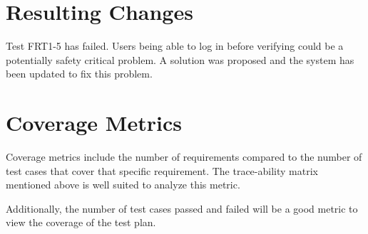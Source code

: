 \documentclass[12pt,fleqn]{article}
\begin{document}
\section{Resulting Changes}
Test FRT1-5 has failed. Users being able to log in before verifying could be a potentially safety critical problem. A solution was proposed and the system has been updated to fix this problem.


\section{Coverage Metrics}
Coverage metrics include the number of requirements compared to the number of test cases that cover that specific requirement. The trace-ability matrix mentioned above is well suited to analyze this metric.

Additionally, the number of test cases passed and failed will be a good metric to view the coverage of the test plan.
\end{document}
